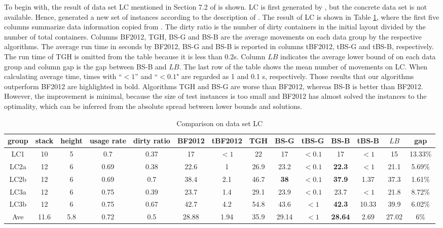 \documentclass[review,3p,times,authoryear,12pt]{elsarticle}
\begin{document}
To begin with, the result of data set LC mentioned in Section 7.2 of \cite{BF2012} is shown.
LC is first generated by \cite{Lee2009}, but the concrete data set is not available.
Hence, \cite{BF2012} generated a new set of instances according to the description of \cite{Lee2009}.
The result of LC is shown in Table \ref{tab:lc}, where the first five columns summarize data information copied from \cite{BF2012}.
The dirty ratio is the number of dirty containers in the initial layout divided by the number of total containers.
Columns BF2012, TGH, BS-G and BS-B are the average movements on each data group by the respective algorithms.
The average run time in seconds by BF2012, BS-G and BS-B is reported in columns tBF2012, tBS-G and tBS-B, respectively.
The run time of TGH is omitted from the table because it is less than 0.2s.
Column $\mathit{LB}$ indicates the average lower bound of \cite{BF2012} on each data group and column gap is the gap between BS-B and $\mathit{LB}$.
The last row of the table shows the mean number of movements on LC.
When calculating average time, times with ``$<1$''  and ``$<0.1$" are regarded as 1 and 0.1 s, respectively.
Those results that our algorithms outperform BF2012 are highlighted in bold.
Algorithms TGH and BS-G are worse than BF2012, whereas BS-B is better than BF2012.
However, the improvement is minimal, because the size of test instances is too small and BF2012 has almost solved the instances to the optimality, which can be inferred from the absolute spread between lower bounds and solutions.

\begin{table}[!htb]
\scriptsize
\centering
  \caption{\label{tab:lc} Comparison on data set LC}
    \begin{tabular}{c|c|c|c|c|c|c|c|c|c|c|c|c|c}

    \hline
    group & stack & height & usage rate & dirty ratio & BF2012 & tBF2012 & TGH   & BS-G  & tBS-G & BS-B  & tBS-B & $\mathit{LB}$ & gap\\
    \hline
    LC1   & 10   & 5  & 0.7  & 0.37 & 17   & $<1$ & 22   & 17         & $<0.1$ & 17             & $<1$   & 15 & 13.33\%\\
    LC2a  & 12   & 6  & 0.69 & 0.38 & 22.6 & 1    & 26.9 & 23.2       & $<0.1$ & \textbf{22.3}  & $<1$   & 21.1 & 5.69\%\\
    LC2b  & 12   & 6  & 0.69 & 0.7  & 38.4 & 2.1  & 46.7 & \textbf{38}& $<0.1$ & \textbf{37.9}  & 1.37   & 37.3 & 1.61\%\\
    LC3a  & 12   & 6  & 0.75 & 0.39 & 23.7 & 1.4  & 29.1 & 23.9       & $<0.1$ & 23.7           & $<1$   & 21.8 & 8.72\%\\
    LC3b  & 12   & 6  & 0.75 & 0.67 & 42.7 & 4.2  & 54.8 & 43.6       & $<1$   & \textbf{42.3}  & 10.33  & 39.9 & 6.02\%\\
    \hline
    Ave   & 11.6 & 5.8& 0.72 & 0.5  & 28.88& 1.94 & 35.9 & 29.14      & $<1$   & \textbf{28.64} & 2.69   & 27.02& 6\%\\
    \hline
    \end{tabular}%
\end{table}%
\end{document}
